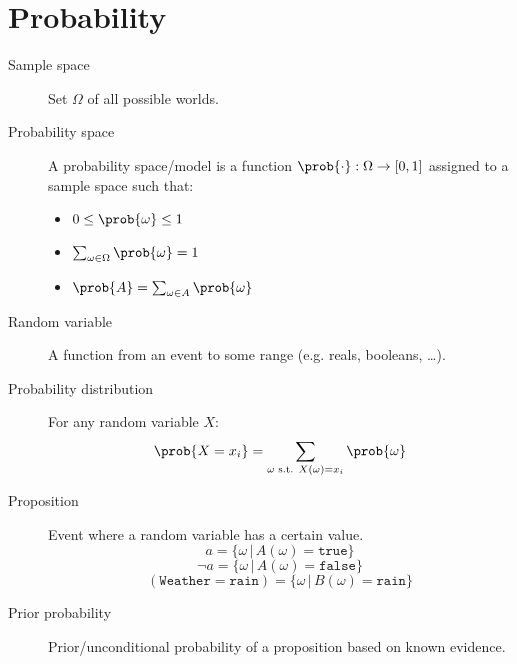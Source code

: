 \chapter{Probability}

\begin{description}
    \item[Sample space] 
        Set $\Omega$ of all possible worlds.

    \item[Probability space] 
        A probability space/model is a function $\prob{\cdot}: \Omega \rightarrow [0, 1]$ assigned to a sample space such that:
        \begin{itemize}
            \item $0 \leq \prob{\omega} \leq 1$
            \item $\sum_{\omega \in \Omega} \prob{\omega} = 1$
            \item $\prob{A} = \sum_{\omega \in A} \prob{\omega}$
        \end{itemize}

    \item[Random variable] 
        A function from an event to some range (e.g. reals, booleans, \dots).

    \item[Probability distribution] 
        For any random variable $X$:
        \[ \prob{X = x_i} = \sum_{\omega \text{ s.t. } X(\omega)=x_i} \prob{\omega} \]

    \item[Proposition] 
        Event where a random variable has a certain value.
        \[ a = \{ \omega \,\vert\, A(\omega) = \texttt{true} \} \]
        \[ \lnot  a = \{ \omega \,\vert\, A(\omega) = \texttt{false} \} \]
        \[ (\texttt{Weather} = \texttt{rain}) = \{ \omega \,\vert\, B(\omega) = \texttt{rain} \} \]

    \item[Prior probability] 
        Prior/unconditional probability of a proposition based on known evidence.
        

\end{description}
